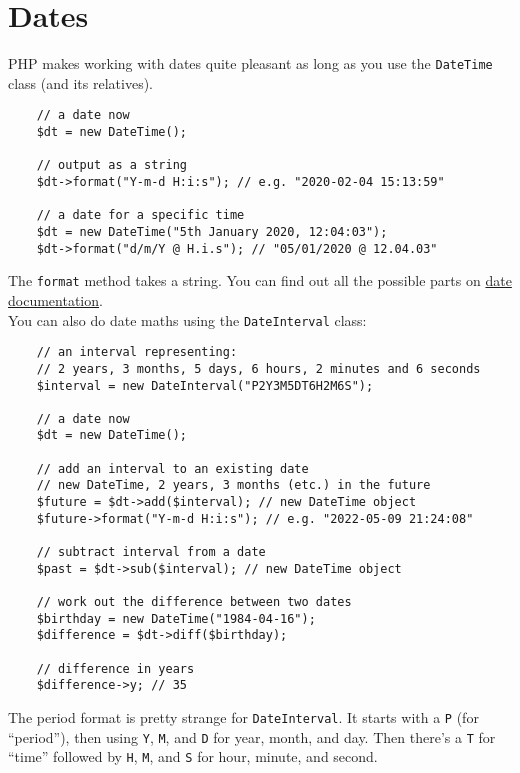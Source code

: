 \section{Dates}

PHP makes working with dates quite pleasant as long as you use the \texttt{DateTime} class (and its relatives).

\begin{verbatim}
    // a date now
    $dt = new DateTime();

    // output as a string
    $dt->format("Y-m-d H:i:s"); // e.g. "2020-02-04 15:13:59"

    // a date for a specific time
    $dt = new DateTime("5th January 2020, 12:04:03");
    $dt->format("d/m/Y @ H.i.s"); // "05/01/2020 @ 12.04.03"
\end{verbatim}

The \texttt{format} method takes a string. You can find out all the possible parts on \href{http://www.php.net/manual/en/function.date.php}{date documentation}.
\\

You can also do date maths using the \texttt{DateInterval} class:

\begin{verbatim}
    // an interval representing:
    // 2 years, 3 months, 5 days, 6 hours, 2 minutes and 6 seconds
    $interval = new DateInterval("P2Y3M5DT6H2M6S");

    // a date now
    $dt = new DateTime();

    // add an interval to an existing date
    // new DateTime, 2 years, 3 months (etc.) in the future
    $future = $dt->add($interval); // new DateTime object
    $future->format("Y-m-d H:i:s"); // e.g. "2022-05-09 21:24:08"

    // subtract interval from a date
    $past = $dt->sub($interval); // new DateTime object

    // work out the difference between two dates
    $birthday = new DateTime("1984-04-16");
    $difference = $dt->diff($birthday);

    // difference in years
    $difference->y; // 35
\end{verbatim}

The period format is pretty strange for \texttt{DateInterval}. It starts with a \texttt{P} (for ``period''), then using \texttt{Y}, \texttt{M}, and \texttt{D} for year, month, and day. Then there's a \texttt{T} for ``time'' followed by \texttt{H}, \texttt{M}, and \texttt{S} for hour, minute, and second.

